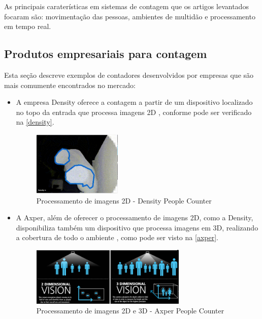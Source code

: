   As principais caraterísticas em sistemas de contagem que os artigos levantados focaram são: movimentação das pessoas, ambientes de multidão e processamento em tempo real.

\subsection{Produtos empresariais para contagem}
\label{produtos-empresas}
Esta seção descreve exemplos de contadores desenvolvidos por empresas que são mais comumente encontrados no mercado: 

\begin{itemize}
\item A empresa Density oferece a contagem a partir de um
dispositivo localizado no topo da entrada que processa imagens 2D \cite{Density2017}, conforme pode ser verificado na \autoref{density}.

\begin{figure}[htb]
  \caption{\label{density}Processamento de imagens 2D - Density People Counter}
  \begin{center}
    \includegraphics[width=0.40\textwidth]{img/density.png}
  \end{center}
\end{figure}

\item A Axper, além de oferecer o processamento de imagens 2D, como a Density, disponibiliza também um dispositivo que processa imagens em 3D, realizando a cobertura de todo o ambiente \cite{Axper2017}, como pode ser visto na \autoref{axper}.

\begin{figure}[htb]
  \caption{\label{axper}Processamento de imagens 2D e 3D - Axper People Counter}
  \begin{center}
    \includegraphics[width=0.70\textwidth]{img/axper.png}
  \end{center}
\end{figure}


\end{itemize}
